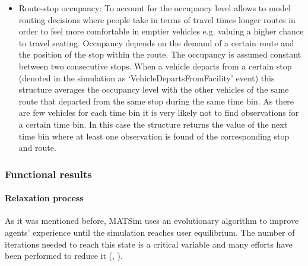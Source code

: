 \begin{itemize}
\item Route-stop occupancy: To account for the occupancy level allows to model routing decisions where people take in terms of travel times longer routes in order to feel more comfortable in emptier vehicles e.g. valuing a higher chance to travel seating. Occupancy depends on the demand of a certain route and the position of the stop within the route. The occupancy is assumed constant between two consecutive stops. When a vehicle departs from a certain stop (denoted in the simulation as `VehicleDepartsFromFacility' event) this structure averages the occupancy level with the other vehicles of the same route that departed from the same stop during the same time bin. As there are few vehicles for each time bin it is very likely not to find observations for a certain time bin. In this case the structure returns the value of the next time bin where at least one observation is found of the corresponding stop and route.

\end{itemize}

\subsubsection{Functional results}

\paragraph{Relaxation process}

As it was mentioned before, MATSim uses an evolutionary algorithm to improve agents' experience until the simulation reaches user equilibrium. The number of iterations needed to reach this state is a critical variable and many efforts have been performed to reduce it (\citep{MeisterEtAl_STRC_2006}, \citep{FourieEtAl_TRB_2013}).

